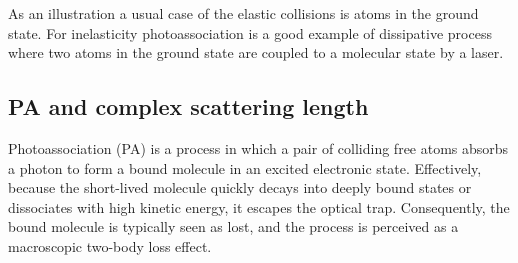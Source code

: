 As an illustration a usual case of the elastic collisions is atoms in the ground
state. For inelasticity photoassociation is a good example of
dissipative process where two atoms in the ground state are coupled to a molecular state by a laser.

\subsection{PA and complex scattering length}
Photoassociation (PA) is a process in which a pair of colliding free atoms absorbs a photon to form a bound molecule in an excited electronic state. Effectively, because the short-lived molecule quickly decays into 
deeply bound states or dissociates with high kinetic energy, it escapes the optical trap. Consequently, the bound molecule is typically seen as lost, and the process is perceived as a macroscopic two-body loss effect.

